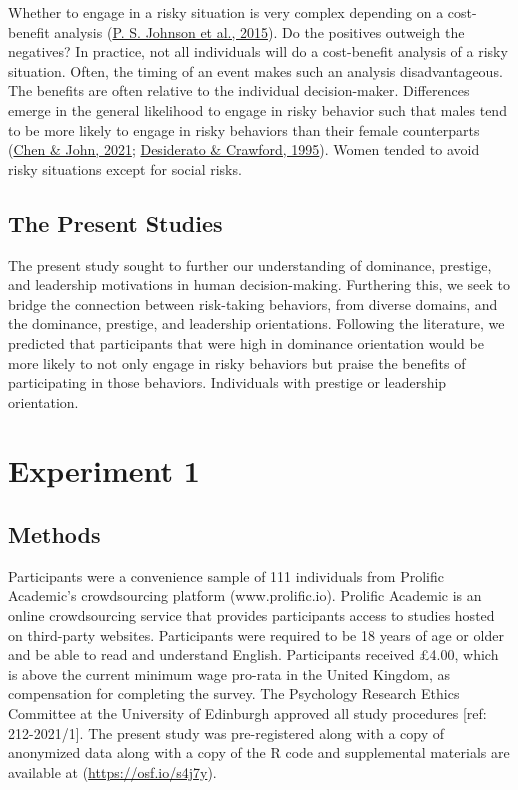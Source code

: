 \documentclass[
  donotrepeattitle,doc, 12pt, a4paper,floatsintext]{apa7}
\begin{document}
Whether to engage in a risky situation is very complex depending on a cost-benefit analysis (\protect\hyperlink{ref-johnson2015a}{P. S. Johnson et al., 2015}). Do the positives outweigh the negatives? In practice, not all individuals will do a cost-benefit analysis of a risky situation. Often, the timing of an event makes such an analysis disadvantageous. The benefits are often relative to the individual decision-maker. Differences emerge in the general likelihood to engage in risky behavior such that males tend to be more likely to engage in risky behaviors than their female counterparts (\protect\hyperlink{ref-chen2021}{Chen \& John, 2021}; \protect\hyperlink{ref-desiderato1995}{Desiderato \& Crawford, 1995}). Women tended to avoid risky situations except for social risks.

\hypertarget{the-present-studies}{%
\subsection{The Present Studies}\label{the-present-studies}}

The present study sought to further our understanding of dominance, prestige, and leadership motivations in human decision-making. Furthering this, we seek to bridge the connection between risk-taking behaviors, from diverse domains, and the dominance, prestige, and leadership orientations. Following the literature, we predicted that participants that were high in dominance orientation would be more likely to not only engage in risky behaviors but praise the benefits of participating in those behaviors. Individuals with prestige or leadership orientation.

\hypertarget{experiment-1}{%
\section{Experiment 1}\label{experiment-1}}

\hypertarget{methods-1}{%
\subsection{Methods}\label{methods-1}}

Participants were a convenience sample of 111 individuals from Prolific Academic's crowdsourcing platform (www.prolific.io). Prolific Academic is an online crowdsourcing service that provides participants access to studies hosted on third-party websites. Participants were required to be 18 years of age or older and be able to read and understand English. Participants received £4.00, which is above the current minimum wage pro-rata in the United Kingdom, as compensation for completing the survey. The Psychology Research Ethics Committee at the University of Edinburgh approved all study procedures {[}ref: 212-2021/1{]}. The present study was pre-registered along with a copy of anonymized data along with a copy of the R code and supplemental materials are available at (\url{https://osf.io/s4j7y}).
\end{document}
